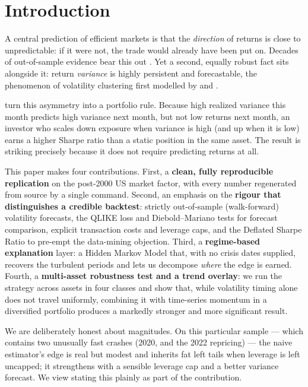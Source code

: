 \documentclass[11pt]{article}
\begin{document}
\section{Introduction}

A central prediction of efficient markets is that the \emph{direction} of returns
is close to unpredictable: if it were not, the trade would already have been put
on. Decades of out-of-sample evidence bear this out \citep{campbell2008predicting}.
Yet a second, equally robust fact sits alongside it: return \emph{variance} is
highly persistent and forecastable, the phenomenon of volatility clustering first
modelled by \citet{engle1982autoregressive} and \citet{bollerslev1986generalized}.

\citet{moreira2017volatility} turn this asymmetry into a portfolio rule. Because
high realized variance this month predicts high variance next month, but not low
returns next month, an investor who scales down exposure when variance is high
(and up when it is low) earns a higher Sharpe ratio than a static position in the
same asset. The result is striking precisely because it does not require
predicting returns at all.

This paper makes four contributions. First, a \textbf{clean, fully reproducible
replication} on the post-2000 US market factor, with every number regenerated
from source by a single command. Second, an emphasis on the \textbf{rigour that
distinguishes a credible backtest}: strictly out-of-sample (walk-forward)
volatility forecasts, the QLIKE loss \citep{patton2011volatility} and
Diebold--Mariano tests \citep{diebold1995comparing} for forecast comparison,
explicit transaction costs and leverage caps, and the Deflated Sharpe Ratio
\citep{bailey2014deflated} to pre-empt the data-mining objection. Third, a
\textbf{regime-based explanation} layer: a Hidden Markov Model
\citep{hamilton1989new} that, with no crisis dates supplied, recovers the
turbulent periods and lets us decompose \emph{where} the edge is earned. Fourth, a
\textbf{multi-asset robustness test and a trend overlay}: we run the strategy
across \nAssets{} assets in four classes and show that, while volatility timing
alone does not travel uniformly, combining it with time-series momentum
\citep{moskowitz2012time} in a diversified portfolio produces a markedly stronger
and more significant result.

We are deliberately honest about magnitudes. On this particular sample --- which
contains two unusually fast crashes (2020, and the 2022 repricing) --- the naive
estimator's edge is real but modest and inherits fat left tails when leverage is
left uncapped; it strengthens with a sensible leverage cap and a better variance
forecast. We view stating this plainly as part of the contribution.
\end{document}
